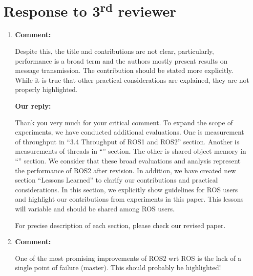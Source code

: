\documentclass{article}
\newcommand\rd{\textsuperscript{rd}\xspace}
\begin{document}
\section{Response to 3\rd reviewer}
\begin{enumerate}

\item \begin{flushleft}
    \textbf{Comment:}
  \end{flushleft}
  Despite this, the title and contributions are not clear, particularly, performance is a broad term and the authors mostly present results on message transmission. 
  The contribution should be stated more explicitly.
  While it is true that other practical considerations are explained, they are not properly highlighted.

  \begin{flushleft}
    \textbf{Our reply:}
  \end{flushleft}
  Thank you very much for your critical comment.
  To expand the scope of experiments, we have conducted additional evaluations.
  One is measurement of throughput in ``3.4 Throughput of ROS1 and ROS2'' section.
  Another is measurements of threads in ``'' section.
  The other is shared object memory in ``'' section.
  We consider that these broad evaluations and analysis represent the performance of ROS2 after revision.
  In addition, we have created new section ``Lessons Learned'' to clarify our contributions and practical considerations.
  In this section, we explicitly show guidelines for ROS users and highlight our contributions from experiments in this paper.
  This lessons will variable and should be shared among ROS users.
  
  For precise description of each section, please check our revised paper.
  
\item \begin{flushleft}
    \textbf{Comment:}
  \end{flushleft}
  One of the most promising improvements of ROS2 wrt ROS is the lack of a single point of failure (master). This should probably be highlighted!


\end{enumerate}
\end{document}
